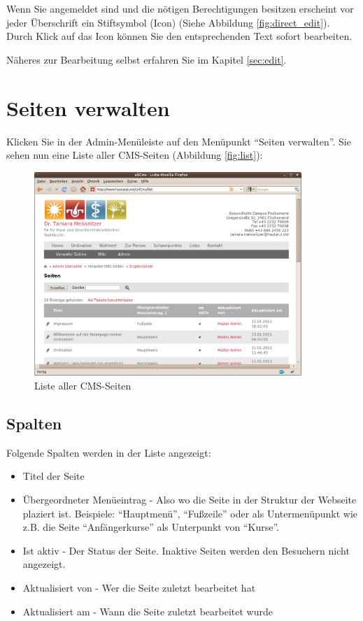 \documentclass[article, a4paper, oneside, 11pt]{memoir}
\begin{document}
Wenn Sie angemeldet sind und die nötigen Berechtigungen besitzen erscheint vor jeder Überschrift ein Stiftsymbol (Icon) (Siehe Abbildung \vref{fig:direct_edit}). Durch Klick auf das Icon können Sie den entsprechenden Text sofort bearbeiten.

Näheres zur Bearbeitung selbst erfahren Sie im Kapitel \vref{sec:edit}.




\section{Seiten verwalten}

Klicken Sie in der Admin-Menüleiste auf den Menüpunkt "`Seiten verwalten"'. Sie sehen nun eine Liste aller CMS-Seiten (Abbildung \vref{fig:list}):

\begin{figure}[htp]
\centering
\includegraphics[width=0.9\textwidth]{list}
\caption{Liste aller CMS-Seiten}
\label{fig:list}
\end{figure}


\subsection{Spalten}

Folgende Spalten werden in der Liste angezeigt:

\begin{itemize}
\item Titel der Seite
\item Übergeordneter Menüeintrag - Also wo die Seite in der Struktur der Webseite plaziert ist. Beispiele: "`Hauptmenü"', "`Fußzeile"' oder als Untermenüpunkt wie z.B. die Seite "`Anfängerkurse"' als Unterpunkt von "`Kurse"'.
\item Ist aktiv - Der Status der Seite. Inaktive Seiten werden den Besuchern nicht angezeigt.
\item Aktualisiert von - Wer die Seite zuletzt bearbeitet hat
\item Aktualisiert am - Wann die Seite zuletzt bearbeitet wurde
\end{itemize}
\end{document}
